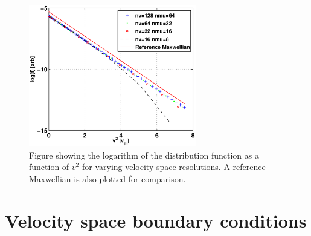 \begin{figure}
\begin{center}
\includegraphics[width=0.65\textwidth]{../benchmarks/collisions/CollisionsMaxwellian.eps}
\caption{Figure showing the logarithm of the distribution function as a function of $v^2$ for varying velocity space resolutions.  A reference 
Maxwellian is also plotted for comparison.}
\label{maxwellcoll}
\end{center}
\end{figure}


\section{Velocity space boundary conditions}

